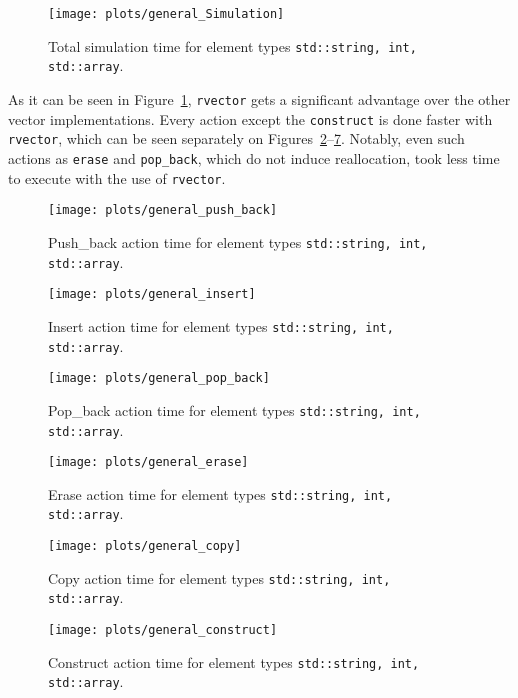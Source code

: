 \documentclass[inz, english, shortabstract]{iithesis}
\begin{document}
\begin{figure}[h!]
\texttt{[image: plots/general\_Simulation]}
\caption{Total simulation time for element types \lstinline{std::string, int, std::array}{}.}
\label{general_simulation}
\end{figure}

As it can be seen in Figure~\ref{general_simulation}, {\tt rvector} gets a significant advantage over the other vector implementations.
Every action except the {\tt construct} is done faster with {\tt rvector}, which can be seen separately on Figures~\ref{general_push_back}--\ref{general_construct}.
Notably, even such actions as {\tt erase} and {\tt pop\_back}, which do not induce reallocation, took less time to execute with the use of {\tt rvector}.

\begin{figure}[h!]
\texttt{[image: plots/general\_push\_back]}
\caption{Push\_back action time for element types \lstinline{std::string, int, std::array}{}.}
\label{general_push_back}
\end{figure}

\begin{figure}[h!]
\texttt{[image: plots/general\_insert]}
\caption{Insert action time for element types \lstinline{std::string, int, std::array}{}.}
\label{general_insert}
\end{figure}

\begin{figure}[h!]
\texttt{[image: plots/general\_pop\_back]}
\caption{Pop\_back action time for element types \lstinline{std::string, int, std::array}{}.}
\label{general_pop_back}
\end{figure}

\begin{figure}[h!]
\texttt{[image: plots/general\_erase]}
\caption{Erase action time for element types \lstinline{std::string, int, std::array}{}.}
\label{general_erase}
\end{figure}

\begin{figure}[h!]
\texttt{[image: plots/general\_copy]}
\caption{Copy action time for element types \lstinline{std::string, int, std::array}{}.}
\label{general_copy}
\end{figure}

\begin{figure}[h!]
\texttt{[image: plots/general\_construct]}
\caption{Construct action time for element types \lstinline{std::string, int, std::array}{}.}
\label{general_construct}
\end{figure}
\end{document}
